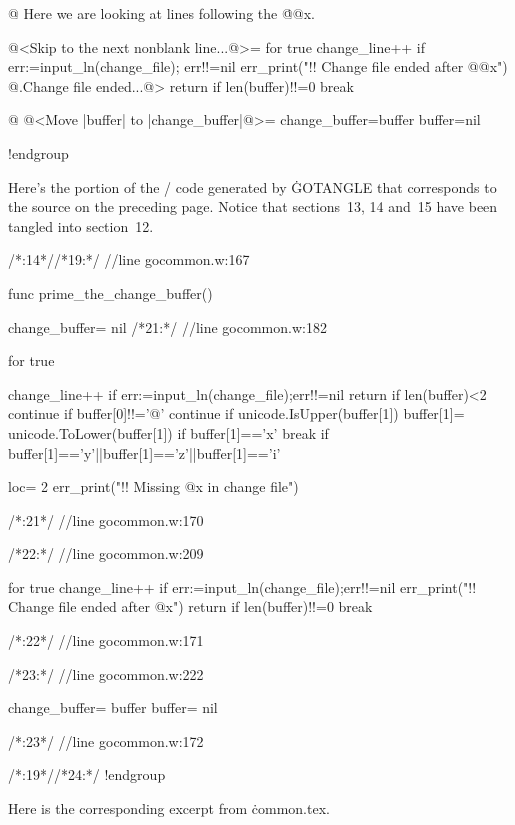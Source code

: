@ Here we are looking at lines following the \.{@@x}.

@<Skip to the next nonblank line...@>=
for true {
        change_line++
        if err:=input_ln(change_file); err!!=nil {
                err_print("!! Change file ended after @@x")
                @.Change file ended...@>
                return
        }
        if len(buffer)!!=0 {
                break
        }
}

@ @<Move |buffer| to |change_buffer|@>=
{
        change_buffer=buffer
        buffer=nil
}

!endgroup
\endgroup
\vfill\eject

\def\runninghead{APPENDIX A  --- TRANSLATION BY {\tentt GOTANGLE}}

Here's the portion of the \GO/ code generated by \.{GOTANGLE} that corresponds
to the source on the preceding page.  Notice that sections~13, 14 and~15
have been tangled into section~12.

\vskip6pt
\begingroup \def\tt{\eighttt} \baselineskip9pt
\verbatim

/*:14*//*19:*/
//line gocommon.w:167

func prime_the_change_buffer(){
change_buffer= nil
/*21:*/
//line gocommon.w:182

for true{
change_line++
if err:=input_ln(change_file);err!!=nil{
return
}
if len(buffer)<2{
continue
}
if buffer[0]!!='@'{
continue
}
if unicode.IsUpper(buffer[1]){
buffer[1]= unicode.ToLower(buffer[1])
}
if buffer[1]=='x'{
break
}
if buffer[1]=='y'||buffer[1]=='z'||buffer[1]=='i'{
loc= 2
err_print("!! Missing @x in change file")

}
}

/*:21*/
//line gocommon.w:170

/*22:*/
//line gocommon.w:209

for true{
change_line++
if err:=input_ln(change_file);err!!=nil{
err_print("!! Change file ended after @x")
return
}
if len(buffer)!!=0{
break
}
}

/*:22*/
//line gocommon.w:171

/*23:*/
//line gocommon.w:222

{
change_buffer= buffer
buffer= nil
}

/*:23*/
//line gocommon.w:172

}

/*:19*//*24:*/
!endgroup
\endgroup
\vfill\eject

\def\runninghead{APPENDIX A --- TRANSLATION BY {\tentt GOWEAVE}}

Here is the corresponding excerpt from \.{common.tex}.

